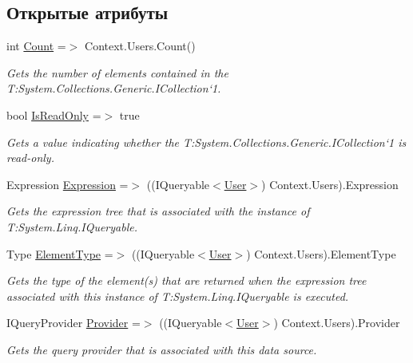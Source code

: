 \subsection*{Открытые атрибуты}
\begin{DoxyCompactItemize}
\item 
int \hyperlink{class_security_1_1_entity_framework_1_1_collections_1_1_user_collection_ace2ff754046fed3949887bdb59b842f2}{Count} =$>$ Context.\+Users.\+Count()
\begin{DoxyCompactList}\small\item\em Gets the number of elements contained in the T\+:\+System.\+Collections.\+Generic.\+I\+Collection`1. \end{DoxyCompactList}\item 
bool \hyperlink{class_security_1_1_entity_framework_1_1_collections_1_1_user_collection_a4c19bdcbdfbf3b3dbeb392c57d9657a7}{Is\+Read\+Only} =$>$ true
\begin{DoxyCompactList}\small\item\em Gets a value indicating whether the T\+:\+System.\+Collections.\+Generic.\+I\+Collection`1 is read-\/only. \end{DoxyCompactList}\item 
Expression \hyperlink{class_security_1_1_entity_framework_1_1_collections_1_1_user_collection_a25f0966d52ce11f4c9f6edfbf244d32d}{Expression} =$>$ ((I\+Queryable$<$\hyperlink{class_security_1_1_model_1_1_user}{User}$>$) Context.\+Users).Expression
\begin{DoxyCompactList}\small\item\em Gets the expression tree that is associated with the instance of T\+:\+System.\+Linq.\+I\+Queryable. \end{DoxyCompactList}\item 
Type \hyperlink{class_security_1_1_entity_framework_1_1_collections_1_1_user_collection_a59ac77647343f73364f927b83a28f46d}{Element\+Type} =$>$ ((I\+Queryable$<$\hyperlink{class_security_1_1_model_1_1_user}{User}$>$) Context.\+Users).Element\+Type
\begin{DoxyCompactList}\small\item\em Gets the type of the element(s) that are returned when the expression tree associated with this instance of T\+:\+System.\+Linq.\+I\+Queryable is executed. \end{DoxyCompactList}\item 
I\+Query\+Provider \hyperlink{class_security_1_1_entity_framework_1_1_collections_1_1_user_collection_ac14ccfbf6bb46ddac76cddc5fd82e427}{Provider} =$>$ ((I\+Queryable$<$\hyperlink{class_security_1_1_model_1_1_user}{User}$>$) Context.\+Users).Provider
\begin{DoxyCompactList}\small\item\em Gets the query provider that is associated with this data source. \end{DoxyCompactList}\end{DoxyCompactItemize}
